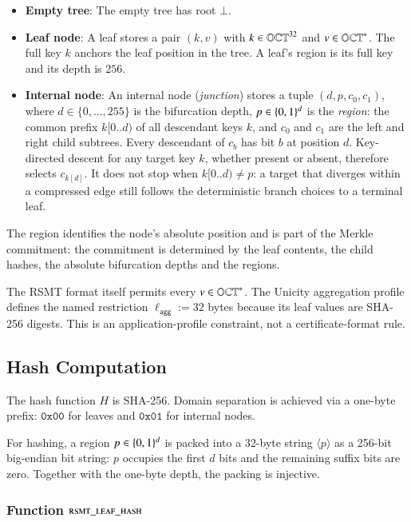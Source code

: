 \begin{itemize}
	\item \textbf{Empty tree}: The empty tree has root $\bot$.
	\item \textbf{Leaf node}: A leaf stores a pair $(k, v)$ with $k \in \mathbb{OCT}^{32}$ and $v \in \mathbb{OCT}^{\ast}$. The full key $k$ anchors the leaf position in the tree. A leaf's region is its full key and its depth is $256$.
	\item \textbf{Internal node}: An internal node (\emph{junction}) stores a tuple $(d, p, c_0, c_1)$, where $d \in \{0, \ldots, 255\}$ is the bifurcation depth, $p \in \{0,1\}^{d}$ is the \emph{region}: the common prefix $k[0..d)$ of all descendant keys $k$, and $c_0$ and $c_1$ are the left and right child subtrees. Every descendant of $c_b$ has bit $b$ at position $d$. Key-directed descent for any target key $k$, whether present or absent, therefore selects $c_{k[d]}$. It does not stop when $k[0..d) \ne p$: a target that diverges within a compressed edge still follows the deterministic branch choices to a terminal leaf.
\end{itemize}

The region identifies the node's absolute position and is part of the Merkle commitment: the commitment is determined by the leaf contents, the child hashes, the absolute bifurcation depths and the regions.

The RSMT format itself permits every $v\in\mathbb{OCT}^{\ast}$.  The Unicity aggregation profile defines the named restriction $\ell_{\mathsf{agg}}:=32$ bytes because its leaf values are SHA-256 digests.  This is an application-profile constraint, not a certificate-format rule.

\subsection{Hash Computation}

The hash function $H$ is SHA-256. Domain separation is achieved via a one-byte prefix: $\mathtt{0x00}$ for leaves and $\mathtt{0x01}$ for internal nodes.

For hashing, a region $p \in \{0,1\}^{d}$ is packed into a 32-byte string $\langle p \rangle$ as a 256-bit big-endian bit string: $p$ occupies the first $d$ bits and the remaining suffix bits are zero. Together with the one-byte depth, the packing is injective.

\subsubsection{Function $\textsc{rsmt\_leaf\_hash}$}\label{sec:rsmt-leaf-hash}

